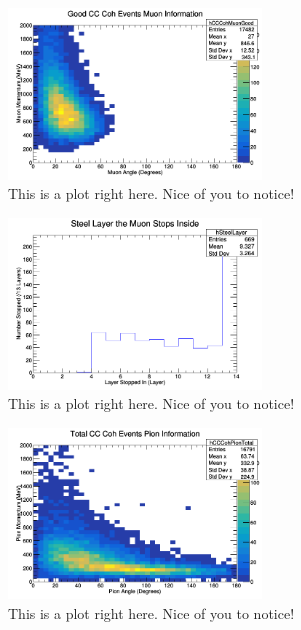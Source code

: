 \documentclass[11pt]{article}
\begin{document}
\begin{figure}[H]
\centering
\includegraphics[width=0.6\textwidth]{OldNMReinSehgalImages/6-GoodCCCohMuonInfoNMORS.png}
\caption{This is a plot right here. Nice of you to notice!}
\end{figure}

\begin{figure}[H]
\centering
\includegraphics[width=0.6\textwidth]{OldNMReinSehgalImages/7-LayerPenetrationNMORS.png}
\caption{This is a plot right here. Nice of you to notice!}
\end{figure}

\begin{figure}[H]
\centering
\includegraphics[width=0.6\textwidth]{OldNMReinSehgalImages/8-TotalCCCohPionInfoNMORS.png}
\caption{This is a plot right here. Nice of you to notice!}
\end{figure}
\end{document}
